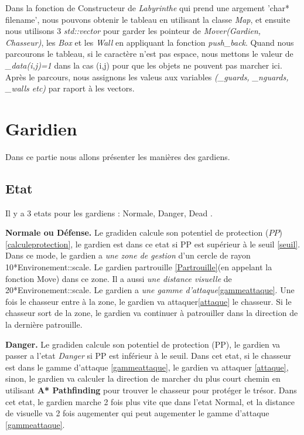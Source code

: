 \documentclass{article}
\begin{document}
Dans la fonction de Constructeur de \textsl{Labyrinthe} qui prend une argement 'char* filename', nous pouvons obtenir le tableau en utilisant la classe \textsl{Map}, et ensuite nous utilisons 3 \textsl{std::vector} pour garder les pointeur de \textsl{Mover(Gardien, Chasseur)}, les \textsl{Box} et les \textsl{Wall} en appliquant la fonction \textsl{push\_back}. Quand nous parcourons le tableau, si le caractère n'est pas espace, nous mettons le valeur de \textsl{\_data(i,j)=1} dans la cas (i,j) pour que les objets ne pouvent pas marcher ici. Après le parcours, nous assignons les valeus aux variables \textsl{(\_guards, \_nguards, \_walls etc)} par raport à les vectors.

\section{Garidien}
Dans ce partie nous allons présenter les manières des gardiens.
\subsection{Etat}
Il y a 3 etats pour les gardiens : Normale, Danger, Dead . 

\textbf{Normale ou Défense.} Le gradiden  calcule son potentiel de protection ($PP$) \ref{calculeprotection}, le gardien est dans ce etat si PP est supérieur à le seuil \ref{seuil}. Dans ce mode, le gardien a \textsl{une zone de gestion} d'un cercle de rayon 10*Environement::scale. Le gardien partrouille \ref{Partrouille}(en appelant la fonction Move) dans ce zone. Il a aussi \textsl{une distance visuelle} de 20*Environement::scale. Le gardien a \textsl{une gamme d'attaque}\ref{gammeattaque}. Une fois le chasseur entre à la zone, le gardien va attaquer\ref{attaque} le chasseur. Si le chasseur sort de la zone, le gardien va continuer à patrouiller dans la direction de la dernière patrouille. 

\textbf{Danger.} Le gradiden  calcule son potentiel de protection (PP), le gardien va passer a l'etat \textsl{Danger} si PP est inférieur à le seuil. Dans cet etat, si le chasseur est dans le gamme d'attaque \ref{gammeattaque}, le gardien va attaquer \ref{attaque}, sinon, le gardien va calculer la direction de marcher du plus court chemin en utilisant \textbf{A* Pathfinding} pour trouver le chasseur pour protéger le trésor. Dans cet etat, le gardien marche 2 fois plus vite que dans l'etat Normal, et la distance de visuelle va 2 fois augementer qui peut augementer le gamme d'attaque \ref{gammeattaque}. 
\end{document}
